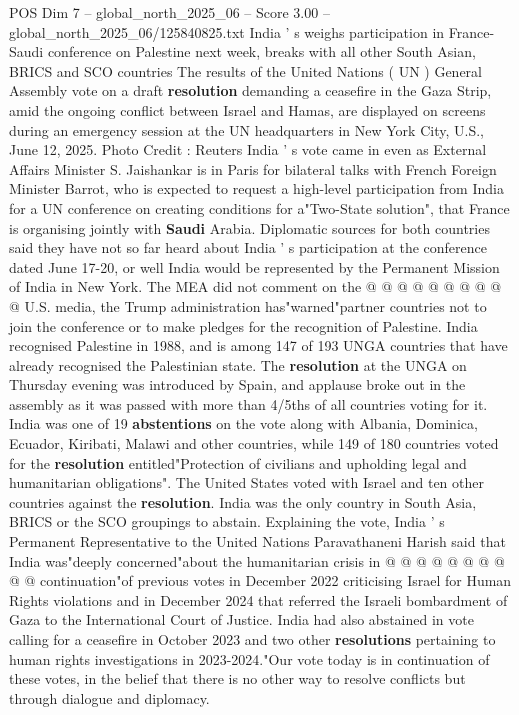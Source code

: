 \begin{textsample}{POS Dim 7 – global\_north\_2025\_06 – Score 3.00 – global\_north\_2025\_06/125840825.txt}  \label{ex:f7_pos_371}
India ' s weighs participation in France-Saudi conference on Palestine next week, breaks with all other South Asian, BRICS and SCO countries The results of the United Nations ( UN ) General Assembly vote on a draft \textbf{resolution} demanding a ceasefire in the Gaza Strip, amid the ongoing conflict between Israel and Hamas, are displayed on screens during an emergency session at the UN headquarters in New York City, U.S., June 12, 2025.
Photo Credit : Reuters India ' s vote came in even as External Affairs Minister S.
Jaishankar is in Paris for bilateral talks with French Foreign Minister Barrot, who is expected to request a high-level participation from India for a UN conference on creating conditions for a"Two-State solution", that France is organising jointly with \textbf{Saudi} Arabia.
Diplomatic sources for both countries said they have not so far heard about India ' s participation at the conference dated June 17-20, or well India would be represented by the Permanent Mission of India in New York.
The MEA did not comment on the @ @ @ @ @ @ @ @ @ @ U.S. media, the Trump administration has"warned"partner countries not to join the conference or to make pledges for the recognition of Palestine.
India recognised Palestine in 1988, and is among 147 of 193 UNGA countries that have already recognised the Palestinian state.
The \textbf{resolution} at the UNGA on Thursday evening was introduced by Spain, and applause broke out in the assembly as it was passed with more than 4/5ths of all countries voting for it.
India was one of 19 \textbf{abstentions} on the vote along with Albania, Dominica, Ecuador, Kiribati, Malawi and other countries, while 149 of 180 countries voted for the \textbf{resolution} entitled"Protection of civilians and upholding legal and humanitarian obligations".
The United States voted with Israel and ten other countries against the \textbf{resolution}.
India was the only country in South Asia, BRICS or the SCO groupings to abstain.
Explaining the vote, India ' s Permanent Representative to the United Nations Paravathaneni Harish said that India was"deeply concerned"about the humanitarian crisis in @ @ @ @ @ @ @ @ @ @ continuation"of previous votes in December 2022 criticising Israel for Human Rights violations and in December 2024 that referred the Israeli bombardment of Gaza to the International Court of Justice.
India had also abstained in vote calling for a ceasefire in October 2023 and two other \textbf{resolutions} pertaining to human rights investigations in 2023-2024."Our vote today is in continuation of these votes, in the belief that there is no other way to resolve conflicts but through dialogue and diplomacy.

\end{textsample}
